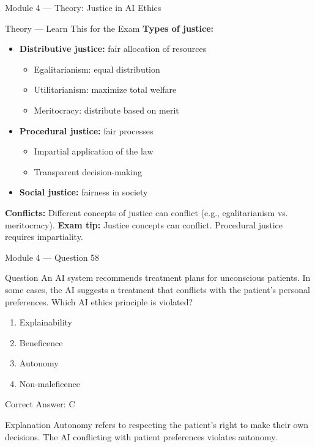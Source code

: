 \documentclass[aspectratio=169,10pt]{beamer}
\newcommand{\question}[1]{%
	\begin{block}{Question}
		#1
	\end{block}
}
\newcommand{\options}[4]{%
	\begin{enumerate}[label=\Alph*.,leftmargin=*]
		\item #1
		\item #2
		\item #3
		\item #4
	\end{enumerate}
}
\newcommand{\answerbox}[1]{%
	\begin{exampleblock}{Correct Answer: #1}
	\end{exampleblock}
}
\newcommand{\explain}[1]{%
	\begin{block}{Explanation}
		\small #1
	\end{block}
}
\newcommand{\theory}[1]{%
	\begin{block}{Theory --- Learn This for the Exam}
		\small #1
	\end{block}
}
\begin{document}
	\begin{frame}{Module 4 --- Theory: Justice in AI Ethics}
		\theory{
			\textbf{Types of justice:}
			\begin{itemize}
				\item \textbf{Distributive justice:} fair allocation of resources
				\begin{itemize}
					\item Egalitarianism: equal distribution
					\item Utilitarianism: maximize total welfare
					\item Meritocracy: distribute based on merit
				\end{itemize}
				\item \textbf{Procedural justice:} fair processes
				\begin{itemize}
					\item Impartial application of the law
					\item Transparent decision-making
				\end{itemize}
				\item \textbf{Social justice:} fairness in society
			\end{itemize}
			\textbf{Conflicts:} Different concepts of justice can conflict (e.g., egalitarianism vs. meritocracy).
			\textbf{Exam tip:} Justice concepts can conflict. Procedural justice requires impartiality.
		}
	\end{frame}
	
	\begin{frame}{Module 4 --- Question 58}
		\question{An AI system recommends treatment plans for unconscious patients. In some cases, the AI suggests a treatment that conflicts with the patient's personal preferences. Which AI ethics principle is violated?}
		\options{Explainability}{Beneficence}{Autonomy}{Non-maleficence}
		\answerbox{C}
		\explain{Autonomy refers to respecting the patient's right to make their own decisions. The AI conflicting with patient preferences violates autonomy.}
	\end{frame}
	
\end{document}
